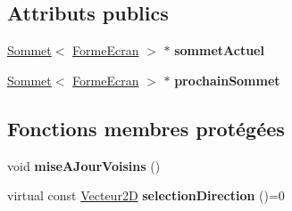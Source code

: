 \subsection*{Attributs publics}
\begin{DoxyCompactItemize}
\item 
\mbox{\label{class_creature_a3cb9ad9627ba8e8fe2444431970d16fb}} 
\mbox{\hyperlink{class_sommet}{Sommet}}$<$ \mbox{\hyperlink{class_forme_ecran}{Forme\+Ecran}} $>$ $\ast$ {\bfseries sommet\+Actuel}
\item 
\mbox{\label{class_creature_af4d2942744f101712aa86a7c5586fa4d}} 
\mbox{\hyperlink{class_sommet}{Sommet}}$<$ \mbox{\hyperlink{class_forme_ecran}{Forme\+Ecran}} $>$ $\ast$ {\bfseries prochain\+Sommet}
\end{DoxyCompactItemize}
\subsection*{Fonctions membres protégées}
\begin{DoxyCompactItemize}
\item 
\mbox{\label{class_creature_ac75bc71239325bc1638097e8d4efebfb}} 
void {\bfseries mise\+A\+Jour\+Voisins} ()
\item 
\mbox{\label{class_creature_a80684f45ad41a4c2e280fb5a3c39635b}} 
virtual const \mbox{\hyperlink{class_vecteur2_d}{Vecteur2D}} {\bfseries selection\+Direction} ()=0
\end{DoxyCompactItemize}
